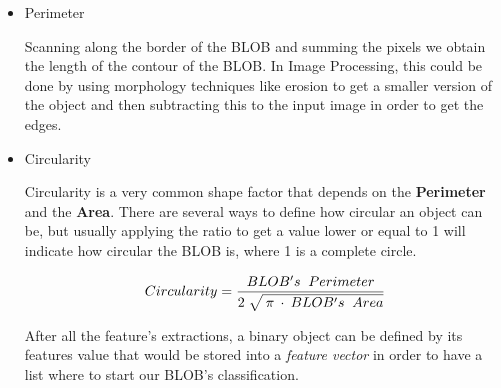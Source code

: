 \begin{itemize}
\item Perimeter

Scanning along the border of the BLOB and summing the pixels we obtain the length of the contour of the BLOB. In Image Processing, this could be done by using morphology techniques like erosion to get a smaller version of the object and then subtracting this to the input image in order to get the edges.

\item Circularity

Circularity is a very common shape factor that depends on the \textbf{Perimeter} and the \textbf{Area}. There are several ways to define how circular an object can be, but usually applying the ratio to get a value lower or equal to 1 will indicate how circular the BLOB is, where 1 is a complete circle.

\begin{equation}	
	\begin{aligned}
	{Circularity}=\displaystyle\frac{BLOB's \;\; Perimeter}{2 \; \sqrt{\mathstrut \: \pi \: \cdot \: {BLOB's \;\; Area}}}
	\label{Circularity}
	\end{aligned}
\end{equation}


After all the feature's extractions, a binary object can be defined by its features value that would be stored into a \textit{feature vector} in order to have a list where to start our BLOB's classification.

\end{itemize}




